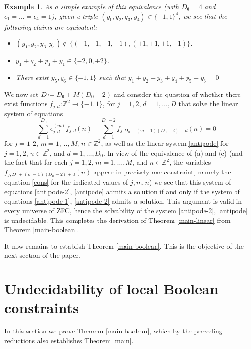 \documentclass[reqno,a4paper,12pt]{amsart}
\numberwithin{equation}{section}
\numberwithin{figure}{section}
\def\Z{\mathbb{Z}}
\theoremstyle{plain}
\newtheorem{example}[thm]{Example}
\theoremstyle{definition}
\begin{document}
\begin{example}  As a simple example of this equivalence (with $D_0=4$ and $\epsilon_1=\dots=\epsilon_4=1$), given a triple $(y_1,y_2,y_3,y_4) \in \{-1,1\}^4$, we see that the following claims are equivalent:
\begin{itemize}
    \item [(a')] $(y_1,y_2,y_3,y_4) \not \in \{ (-1,-1,-1,-1), (+1,+1,+1,+1) \}$.
    \item[(b')] $y_1+y_2+y_3+y_4 \in \{-2,0,+2\}$.
    \item[(c')] There exist $y_5, y_6 \in \{-1,1\}$ such that $y_1+y_2+y_3+y_4+y_5+y_6 = 0$.
\end{itemize}
\end{example}

We now set $D \coloneqq D_0 + M(D_0-2)$ and consider the question of whether there exist functions $f_{j,d} \colon \Z^2 \to \{-1,1\}$, for $j=1,2$, $d=1,\dots,D$ that solve the linear system of equations
\begin{equation}\label{cons}
\sum_{d=1}^{D_0} \epsilon_{j,d}^{(m)} f_{j,d}(n) + \sum_{d=1}^{D_0-2} f_{j,D_0+(m-1)(D_0-2)+d}(n) = 0
\end{equation}
for $j=1,2$, $m=1,\dots,M$, $n \in \Z^2$, as well as the linear system \eqref{antipode} for $j=1,2$, $n \in \Z^2$, and $d=1,\dots,D_0$.  In view of the equivalence of (a) and (c) (and the fact that for each $j=1,2$, $m=1,\dots,M$, and $n \in \Z^2$, the variables $f_{j,D_0+(m-1)(D_0-2)+d}(n)$ appear in precisely one constraint, namely the equation \eqref{cons} for the indicated values of $j,m,n$) we see that this system of equations \eqref{antipode-2}, \eqref{antipode} admits a solution if and only if the system of equations \eqref{antipode-1}, \eqref{antipode-2} admits a solution.  This argument is valid in every universe of ZFC, hence the solvability of the system \eqref{antipode-2}, \eqref{antipode} is undecidable.  This completes the derivation of Theorem \ref{main-linear} from Theorem \ref{main-boolean}.

It now remains to establish Theorem \ref{main-boolean}.  This is the objective of the next section of the paper.

\section{Undecidability of local Boolean constraints}\label{tiling}

In this section we prove Theorem \ref{main-boolean}, which by the preceding reductions also establishes Theorem \ref{main}.
\end{document}
